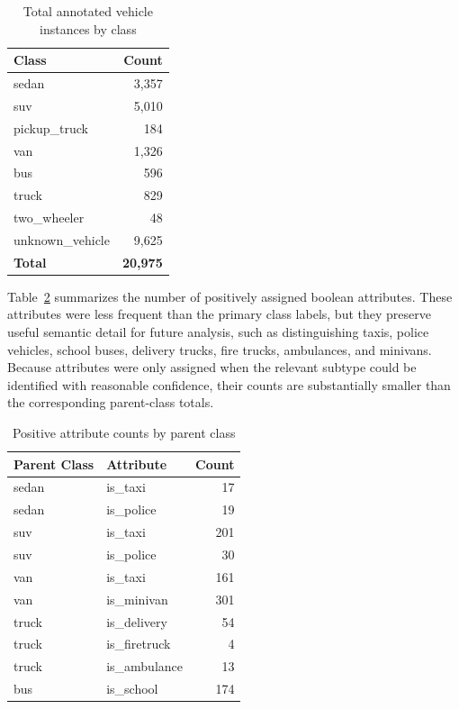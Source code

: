 \begin{table}[!htbp]
    \centering
    \caption{Total annotated vehicle instances by class}
    \label{tab:class-counts}
    \begin{tabular}{lr}
        \toprule
        \textbf{Class} & \textbf{Count} \\
        \midrule
        sedan            & 3,357 \\
        suv              & 5,010 \\
        pickup\_truck    & 184 \\
        van              & 1,326 \\
        bus              & 596 \\
        truck            & 829 \\
        two\_wheeler     & 48 \\
        unknown\_vehicle & 9,625 \\
        \midrule
        \textbf{Total}   & \textbf{20,975} \\
        \bottomrule
    \end{tabular}
\end{table}

Table~\ref{tab:attribute-counts} summarizes the number of positively assigned 
boolean attributes. These attributes were less frequent than the primary class 
labels, but they preserve useful semantic detail for future analysis, such as 
distinguishing taxis, police vehicles, school buses, delivery trucks, fire trucks,
ambulances, and minivans. Because attributes were only assigned when the relevant
subtype could be identified with reasonable confidence, their counts are 
substantially smaller than the corresponding parent-class totals.

\begin{table}[!htbp]
    \centering
    \caption{Positive attribute counts by parent class}
    \label{tab:attribute-counts}
    \begin{tabular}{llr}
        \toprule
        \textbf{Parent Class} & \textbf{Attribute} & \textbf{Count} \\
        \midrule
        sedan  & is\_taxi       & 17 \\
        sedan  & is\_police     & 19 \\
        \midrule
        suv    & is\_taxi       & 201 \\
        suv    & is\_police     & 30 \\
        \midrule
        van    & is\_taxi       & 161 \\
        van    & is\_minivan    & 301 \\
        \midrule
        truck  & is\_delivery   & 54 \\
        truck  & is\_firetruck  & 4 \\
        truck  & is\_ambulance  & 13 \\
        \midrule
        bus    & is\_school     & 174 \\
        \bottomrule
    \end{tabular}
\end{table}


